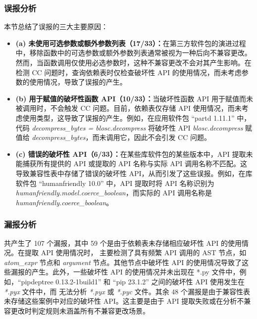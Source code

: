 \subsubsection{误报分析}
本节总结了\tool{}误报的三大主要原因：
\begin{itemize}
	\item \textbf{(a) 未使用可选参数或额外参数列表（17/33）：}在第三方软件包的演进过程中，移除函数中的可选参数或额外参数列表通常被视为一种后向不兼容更改。然而，当函数调用仅使用必选参数时，这种不兼容更改不会对其产生影响。在检测 CC 问题时，\tool{}查询依赖表时仅检查破坏性 API 的使用情况，而未考虑参数的使用情况，导致了误报的产生。
	\item \textbf{ (b) 用于赋值的破坏性函数 API（10/33）：}当破坏性函数 API 用于赋值而未被调用时，不会触发 CC 问题。目前，依赖表仅存储 API 使用情况，而未考虑使用类型，这导致了误报的产生。例如，在应用软件包 “partd 1.11.1”  中，代码 \textit{decompress\_bytes = blosc.decompress} 将破坏性 API \textit{blosc.decompress} 赋值给 \textit{decompress\_bytes}，而未调用它，因此不会引发 CC 问题。
	\item \textbf{ (c) 错误的破坏性 API（6/33）：}在某些库软件包的某些版本中，API 提取未能捕获所有提供的 API 或提取的 API 名称与实际 API 调用名称不匹配。这导致兼容性表中存储了错误的破坏性 API，从而引发了这些误报。例如，在库软件包 “humanfriendly 10.0”  中，API 提取时将 API 名称识别为 \textit{humanfriendly.model.coerce\_boolean}，而实际的 API 调用名称是 \textit{humanfriendly.coerce\_boolean}。
\end{itemize}

\subsubsection{漏报分析}
\tool{} 共产生了 107 个漏报，其中 59 个是由于依赖表未存储相应破坏性 API 的使用情况。在提取 API 使用情况时，\tool{} 主要检测了具有频繁 API 调用的 AST 节点，如 \textit{atom\_expr} 节点和 \textit{argument} 节点。其他节点中破坏性 API 的使用情况导致了这些漏报的产生。此外，一些破坏性 API 的使用情况并未出现在 *.py 文件中，例如，“pipdeptree 0.13.2-1build1”  和 “pip 23.1.2”  之间的破坏性 API 使用发生在 \textit{*.pyx} 文件中，而 \tool{} 无法分析 \textit{*.pyx} 或 \textit{*.pyc} 文件。其余 48 个漏报是由于兼容性表未存储这些案例中对应的破坏性 API。这主要是由于 API 提取失败或在分析不兼容更改时判定规则未涵盖所有不兼容更改场景。


